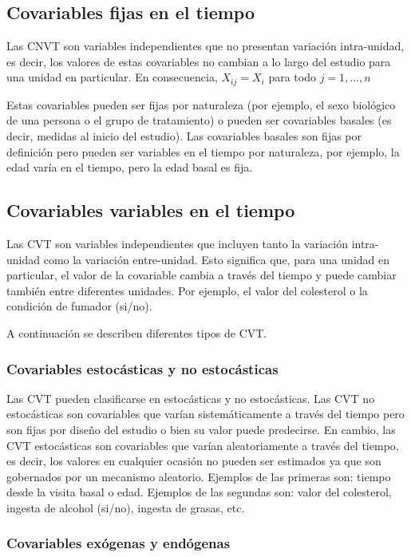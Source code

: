 \documentclass[spanish]{article}
\numberwithin{figure}{subsection}
\numberwithin{equation}{subsection}
\numberwithin{table}{subsection}
\begin{document}
\subsection{Covariables fijas en el tiempo}

Las CNVT son variables independientes que no presentan variación intra-unidad,
es decir, los valores de estas covariables no cambian a lo largo del estudio
para una unidad en particular. En consecuencia, $X_{ij} = X_i$ para todo
$j = 1, ..., n$

Estas covariables pueden ser fijas por naturaleza (por ejemplo, el sexo
biológico de una persona o el grupo de tratamiento) o pueden ser covariables
basales (es decir, medidas al inicio del estudio). Las covariables basales son
fijas por definición pero pueden ser variables en el tiempo por naturaleza, por
ejemplo, la edad varía en el tiempo, pero la edad basal es fija.

\subsection{Covariables variables en el tiempo}

Las CVT son variables independientes que incluyen tanto la variación
intra-unidad como la variación entre-unidad. Esto significa que, para una unidad
en particular, el valor de la covariable cambia a través del tiempo y puede
cambiar también entre diferentes unidades. Por ejemplo, el valor del colesterol
o la condición de fumador (si/no).

A continuación se describen diferentes tipos de CVT.

\subsubsection{Covariables estocásticas y no estocásticas}

Las CVT pueden clasificarse en estocásticas y no estocásticas. Las CVT no
estocásticas son covariables que varían sistemáticamente a través del tiempo
pero son fijas por diseño del estudio o bien su valor puede predecirse. En
cambio, las CVT estocásticas son covariables que varían aleatoriamente a través
del tiempo, es decir, los valores en cualquier ocasión no pueden ser estimados
ya que son gobernados por un mecanismo aleatorio. Ejemplos de las primeras son:
tiempo desde la visita basal o edad. Ejemplos de las segundas son: valor del
colesterol, ingesta de alcohol (si/no), ingesta de grasas, etc.

\subsubsection{Covariables exógenas y endógenas}
\label{seccion_de_exogeneidad}
\end{document}

